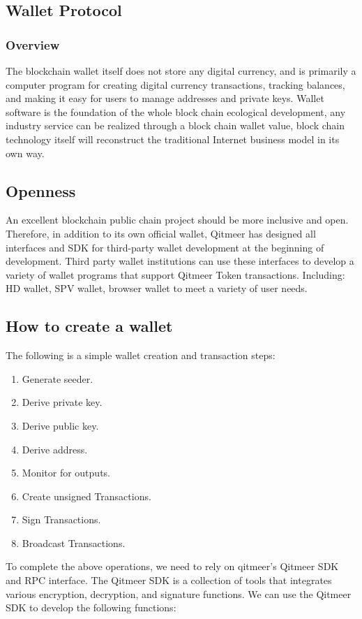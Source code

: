 \documentclass[a4paper,11pt]{article}
\begin{document}
\subsection{Wallet Protocol}
\subsubsection{Overview}
   The blockchain wallet itself does not store any digital currency, and is primarily a computer program for creating digital currency transactions, tracking balances, and making it easy for users to manage addresses and private keys. Wallet software is the foundation of the whole block chain ecological development, any industry service can be realized through a block chain wallet value, block chain technology itself will reconstruct the traditional Internet business model in its own way. 
\subsection*{Openness}
   An excellent blockchain public chain project should be more inclusive and open. Therefore, in addition to its own official wallet, Qitmeer has designed all interfaces and SDK for third-party wallet development at the beginning of development. Third party wallet institutions can use these interfaces to develop a variety of wallet programs that support Qitmeer Token transactions. Including: HD wallet, SPV wallet, browser wallet to meet a variety of user needs.
\subsection*{How to create a wallet}
   The following is a simple wallet creation and transaction steps:
\begin{enumerate}
	\item  Generate seeder.
    \item  Derive private key.
    \item  Derive public key.
    \item  Derive address.
    \item  Monitor for outputs.
    \item  Create unsigned Transactions.
    \item  Sign Transactions.
    \item  Broadcast Transactions.
\end{enumerate}

   To complete the above operations, we need to rely on qitmeer's Qitmeer SDK and RPC interface.
   The Qitmeer SDK is a collection of tools that integrates various encryption, decryption, and signature functions. We can use the Qitmeer SDK to develop the following functions:
\end{document}
